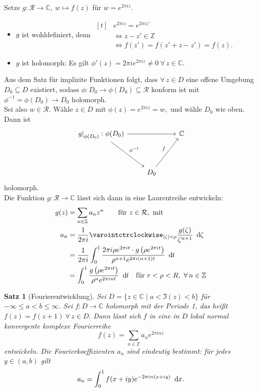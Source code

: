 \documentclass[a4paper,12pt]{article}
\theoremstyle{newthm}
\newtheorem{thm}{Satz}[subsection]
\theoremstyle{newdef}
\theoremstyle{newrem}
\newcommand{\Z}{\mathbb{Z}}
\newcommand{\C}{\mathbb{C}}
\renewcommand{\d}{\ \operatorname{d}\hspace{-2px}}
\newcommand{\bound}[2]{\left.#1\right|_{#2}}
\begin{document}
		Setze $ g: \mathcal{R} \to \C,\ w \mapsto f(z) $ für $ w = e^{2\pi iz} $.
		\begin{itemize}
			\item $g$ ist wohldefiniert, denn $ \begin{aligned}[t]
			&e^{2\pi iz} = e^{2\pi iz'} \\
			&\iff z - z' \in \Z \\
			&\iff f(z') = f(z' + z-z') = f(z).
			\end{aligned} $
			\item $g$ ist holomorph: Es gilt $ \phi'(z) = 2\pi i e^{2\pi iz} \neq 0\ \forall\, z \in \C. $
		\end{itemize}
		Aus dem Satz für implizite Funktionen folgt, dass $ \forall\, z \in D $ eine offene Umgebung $ D_0 \subseteq D $ existiert, sodass $ \phi: D_0 \to \phi(D_0) \subseteq \mathcal{R} $ konform ist mit $ \phi^{-1} = \phi(D_0) \to D_0 $ holomorph.\\
		Sei also $ w \in \mathcal{R}. $ Wähle $ z \in D $ mit $ \phi(z) = e^{2\pi iz} = w, $ und wähle $D_0$ wie oben. Dann ist
		$$\begin{tikzcd}
			\bound{g}{\phi(D_0)}:\phi(D_0)\arrow{rr}\arrow{ddr}{\phi^{-1}} & & \C\\
			&&\\
			&D_0 \arrow{uur}{f}
		\end{tikzcd}$$
		holomorph.\\
		Die Funktion $ g: \mathcal{R} \to \C $ lässt sich dann in eine Laurentreihe entwickeln:
		\begin{align*}
			g(z) &= \sum_{n \in \Z} a_nz^n\qquad \text{für } z \in \mathcal{R},\ \text{mit}\\
			a_n &= \frac{1}{2\pi i} \varointctrclockwise_{|\zeta| = \rho} \frac{g(\zeta)}{\zeta^{n+1}}\d\zeta\\
			&= \frac{1}{2\pi i} \int_0^1 \frac{2\pi i \rho e^{2\pi it} \cdot g\left(\rho e^{2\pi it}\right)}{\rho^{n+1} e^{2\pi i(n+1)t}} \d t\\
			&= \int_0^1 \frac{g\left( \rho e^{2\pi it} \right)}{\rho^n e^{2\pi int}} \d t \quad \text{für } r<\rho<R,\ \forall\, n \in \Z
		\end{align*}
		
		\begin{thm}[Fourierentwicklung]
			Sei $ D = \{ z \in \C \mid  a < \Im(z) < b \} $ für $ -\infty \leq a < b \leq \infty $. Sei $ f: D \to \C $ holomorph mit der Periode 1, das heißt $ f(z) = f(z+1)\ \forall \, z \in D. $ Dann lässt sich $f$ in eine in $D$ lokal normal konvergente komplexe \emph{Fourierreihe} 
			\[ f(z) = \sum_{n \in \Z} a_n e^{2\pi inz} \]
			entwickeln. Die \emph{Fourierkoeffizienten} $a_n$ sind eindeutig bestimmt: für jedes $ y \in (a,b) $ gilt
			\[ a_n = \int_0^1 f(x+iy)e^{-2\pi in(x+iy)} \d x. \]
		\end{thm}
	
\end{document}
